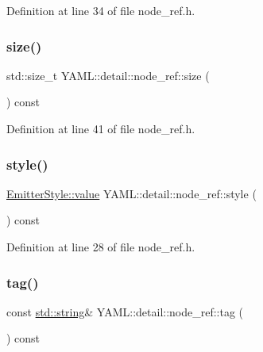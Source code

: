 Definition at line 34 of file node\+\_\+ref.\+h.

\mbox{\label{class_y_a_m_l_1_1detail_1_1node__ref_ab859942cf41db4c0e4892d615b2903fe}} 
\subsubsection{\texorpdfstring{size()}{size()}}
{\footnotesize\ttfamily std\+::size\+\_\+t Y\+A\+M\+L\+::detail\+::node\+\_\+ref\+::size (\begin{DoxyParamCaption}{ }\end{DoxyParamCaption}) const\hspace{0.3cm}{\ttfamily [inline]}}



Definition at line 41 of file node\+\_\+ref.\+h.

\mbox{\label{class_y_a_m_l_1_1detail_1_1node__ref_ac776372410da93e730c8ffab7b547c07}} 
\subsubsection{\texorpdfstring{style()}{style()}}
{\footnotesize\ttfamily \mbox{\hyperlink{struct_y_a_m_l_1_1_emitter_style_ae86640662c85ce6062a37f9636b6959f}{Emitter\+Style\+::value}} Y\+A\+M\+L\+::detail\+::node\+\_\+ref\+::style (\begin{DoxyParamCaption}{ }\end{DoxyParamCaption}) const\hspace{0.3cm}{\ttfamily [inline]}}



Definition at line 28 of file node\+\_\+ref.\+h.

\mbox{\label{class_y_a_m_l_1_1detail_1_1node__ref_a1b430d732fe80b2fdfaa5103e329e428}} 
\subsubsection{\texorpdfstring{tag()}{tag()}}
{\footnotesize\ttfamily const \mbox{\hyperlink{glad_8h_ac83513893df92266f79a515488701770}{std\+::string}}\& Y\+A\+M\+L\+::detail\+::node\+\_\+ref\+::tag (\begin{DoxyParamCaption}{ }\end{DoxyParamCaption}) const\hspace{0.3cm}{\ttfamily [inline]}}



